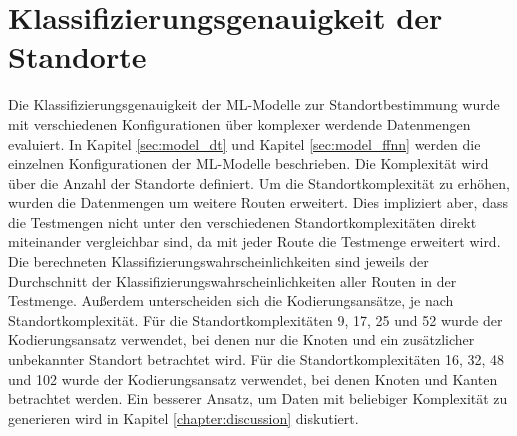 \section{Klassifizierungsgenauigkeit der Standorte}
Die Klassifizierungsgenauigkeit der ML-Modelle zur Standortbestimmung wurde mit verschiedenen Konfigurationen über komplexer werdende Datenmengen evaluiert.
In Kapitel \ref{sec:model_dt} und Kapitel \ref{sec:model_ffnn} werden die einzelnen Konfigurationen der ML-Modelle beschrieben.
Die Komplexität wird über die Anzahl der Standorte definiert.
Um die Standortkomplexität zu erhöhen, wurden die Datenmengen um weitere Routen erweitert.
Dies impliziert aber, dass die Testmengen nicht unter den verschiedenen Standortkomplexitäten direkt miteinander vergleichbar sind, da mit jeder Route die Testmenge erweitert wird.
Die berechneten Klassifizierungswahrscheinlichkeiten sind jeweils der Durchschnitt der Klassifizierungswahrscheinlichkeiten aller Routen in der Testmenge.
\newline
\newline
Außerdem unterscheiden sich die Kodierungsansätze, je nach Standortkomplexität.
Für die Standortkomplexitäten 9, 17, 25 und 52 wurde der Kodierungsansatz verwendet, bei denen nur die Knoten und ein zusätzlicher unbekannter Standort betrachtet wird.
Für die Standortkomplexitäten 16, 32, 48 und 102 wurde der Kodierungsansatz verwendet, bei denen Knoten und Kanten betrachtet werden.
Ein besserer Ansatz, um Daten mit beliebiger Komplexität zu generieren wird in Kapitel \ref{chapter:discussion} diskutiert.

